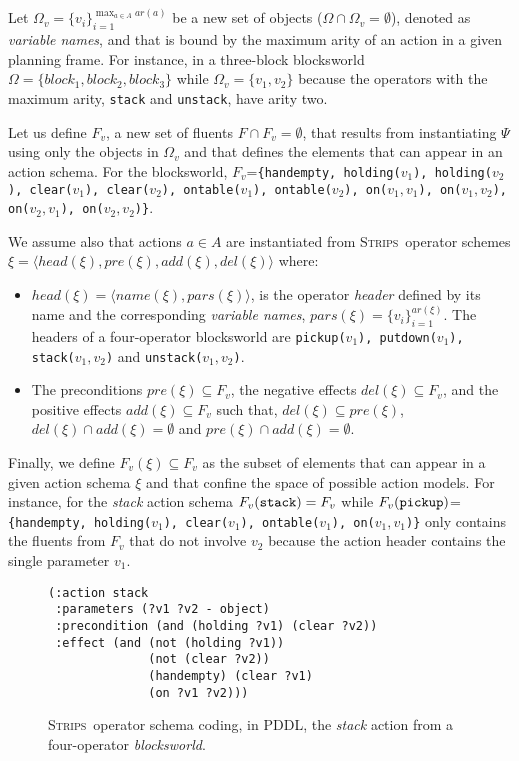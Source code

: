 \documentclass{article}
\newcommand{\tup}[1]{{\langle #1 \rangle}}
\newcommand{\strips}{\textsc{Strips}}     %
\begin{document}
Let $\Omega_v=\{v_i\}_{i=1}^{\operatorname*{max}_{a\in A} ar(a)}$ be a new set of objects ($\Omega\cap\Omega_v=\emptyset$), denoted as {\em variable names}, and that is bound by the maximum arity of an action in a given planning frame. For instance, in a three-block blocksworld $\Omega=\{block_1, block_2, block_3\}$ while $\Omega_v=\{v_1, v_2\}$ because the operators with the maximum arity, {\small\tt stack} and {\small\tt unstack}, have arity two.

Let us define $F_v$, a new set of fluents $F\cap F_v=\emptyset$, that results from instantiating $\Psi$ using only the objects in $\Omega_v$ and that defines the elements that can appear in an action schema. For the blocksworld, $F_v$={\small\tt\{handempty, holding($v_1$), holding($v_2$), clear($v_1$), clear($v_2$), ontable($v_1$), ontable($v_2$), on($v_1,v_1$), on($v_1,v_2$), on($v_2,v_1$), on($v_2,v_2$)\}}.

We assume also that actions $a\in A$ are instantiated from \strips\ operator schemes $\xi=\tup{head(\xi),pre(\xi),add(\xi),del(\xi)}$ where:
\begin{itemize}
\item $head(\xi)=\tup{name(\xi),pars(\xi)}$, is the operator {\em header} defined by its name and the corresponding {\em variable names}, $pars(\xi)=\{v_i\}_{i=1}^{ar(\xi)}$. The headers of a four-operator blocksworld are {\small\tt pickup($v_1$), putdown($v_1$), stack($v_1,v_2$)} and {\small\tt unstack($v_1,v_2$)}.
\item The preconditions $pre(\xi)\subseteq F_v$, the negative effects $del(\xi)\subseteq F_v$, and the positive effects $add(\xi)\subseteq F_v$ such that, $del(\xi)\subseteq pre(\xi)$, $del(\xi)\cap add(\xi)=\emptyset$ and $pre(\xi)\cap add(\xi)=\emptyset$.
\end{itemize}

Finally, we define $F_v(\xi)\subseteq F_v$ as the subset of elements that can appear in a given action schema $\xi$ and that confine the space of possible action models. For instance, for the {\em stack} action schema $F_v({\tt stack})=F_v$ while $F_v({\tt pickup})$={\small\tt\{handempty, holding($v_1$), clear($v_1$), ontable($v_1$), on($v_1,v_1$)\}} only contains the fluents from $F_v$ that do not involve $v_2$ because the action header contains the single parameter $v_1$.

\begin{figure}
\begin{footnotesize}
\begin{verbatim}
(:action stack
 :parameters (?v1 ?v2 - object)
 :precondition (and (holding ?v1) (clear ?v2))
 :effect (and (not (holding ?v1))
              (not (clear ?v2))
              (handempty) (clear ?v1)
              (on ?v1 ?v2)))
\end{verbatim}
\end{footnotesize}
 \caption{\small \strips\ operator schema coding, in PDDL, the {\em stack} action from a four-operator {\em blocksworld}.}
\label{fig:stack}
\end{figure}
\end{document}
